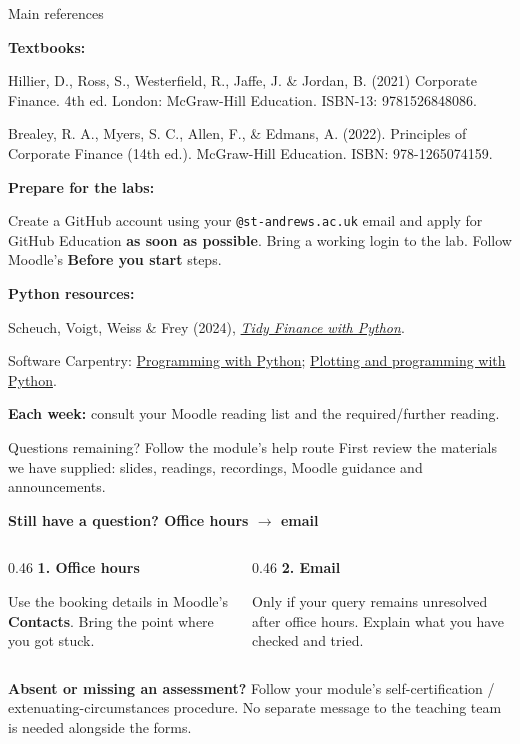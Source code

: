 \documentclass[9pt,aspectratio=169]{beamer}
\begin{document}
\begin{frame}{Main references}

\textbf{Textbooks:}

Hillier, D., Ross, S., Westerfield, R., Jaffe, J. \& Jordan, B. (2021) Corporate Finance. 4th ed.
London: McGraw-Hill Education. ISBN-13: 9781526848086.

Brealey, R. A., Myers, S. C., Allen, F., \& Edmans, A. (2022). Principles of Corporate Finance (14th ed.). McGraw-Hill Education. ISBN: 978-1265074159.

\textbf{Prepare for the labs:}

Create a GitHub account using your \texttt{@st-andrews.ac.uk} email and apply for GitHub Education \textbf{as soon as possible}. Bring a working login to the lab. Follow Moodle's \textbf{Before you start} steps.

\textbf{Python resources:}

Scheuch, Voigt, Weiss \& Frey (2024), \href{https://www.tidy-finance.org/python/}{\textit{Tidy Finance with Python}}.

Software Carpentry: \href{https://swcarpentry.github.io/python-novice-inflammation/}{Programming with Python}; \href{https://swcarpentry.github.io/python-novice-gapminder}{Plotting and programming with Python}.

\textbf{Each week:} consult your Moodle reading list and the required/further reading.
    
\end{frame}

\begin{frame}{Questions remaining? Follow the module's help route}
First review the materials we have supplied: slides, readings, recordings, Moodle guidance and announcements.
\par\medskip
\textcolor{StAndrewsBurgundy}{\textbf{Still have a question? Office hours $\rightarrow$ email}}
\par\medskip
\begin{columns}[T,onlytextwidth]
\begin{column}{0.46\textwidth}
\textcolor{StAndrewsBlue}{\textbf{1. Office hours}}\par
Use the booking details in Moodle's \textbf{Contacts}. Bring the point where you got stuck.
\end{column}
\begin{column}{0.46\textwidth}
\textcolor{StAndrewsBlue}{\textbf{2. Email}}\par
Only if your query remains unresolved after office hours. Explain what you have checked and tried.
\end{column}
\end{columns}
\par\medskip
\textbf{Absent or missing an assessment?} Follow your module's self-certification / extenuating-circumstances procedure. No separate message to the teaching team is needed alongside the forms.
  
\end{frame}
\end{document}

